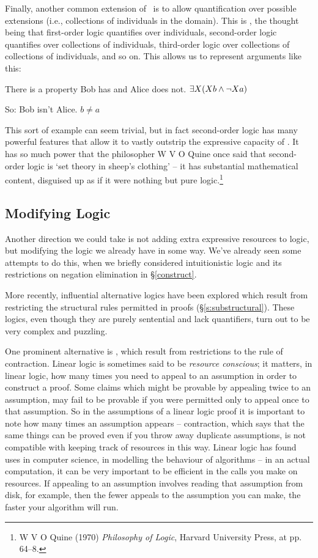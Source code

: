 Finally, another common extension of \FOL\ is to allow quantification over possible extensions (i.e., collections of individuals in the domain). This is , the thought being that first-order logic quantifies over individuals, second-order logic quantifies over collections of individuals, third-order logic over collections of collections of individuals, and so on. This allows us to represent arguments like this: \begin{earg}
	\item There is a property Bob has and Alice does not. $\exists X (Xb \wedge \neg Xa)$
	\item[So:] Bob isn't Alice. $b≠a$
\end{earg}
This sort of example can seem trivial, but in fact second-order logic has many powerful features that allow it to vastly outstrip the expressive capacity of \FOL. It has so much power that the philosopher W V O Quine once said that second-order logic is `set theory in sheep's clothing' – it has substantial mathematical content, disguised up as if it were nothing but pure logic.\footnote{W V O Quine (1970) \emph{Philosophy of Logic}, Harvard University Press, at pp. 64–8.}

\subsection{Modifying Logic}

Another direction we could take is not adding extra expressive resources to logic, but modifying the logic we already have in some way. We've already seen some attempts to do this, when we briefly considered intuitionistic logic and its restrictions on negation elimination in §\ref{construct}. 

More recently, influential alternative logics have been explored which result from restricting the structural rules permitted in proofs (§\ref{s:substructural}). These logics, even though they are purely sentential and lack quantifiers, turn out to be very complex and puzzling.

One prominent alternative is , which result from restrictions to the rule of contraction. Linear logic is sometimes said to be \emph{resource conscious}; it matters, in linear logic, how many times you need to appeal to an assumption in order to construct a proof. Some claims which might be provable by appealing twice to an assumption, may fail to be provable if you were permitted only to appeal once to that assumption. So in the assumptions of a linear logic proof it is important to note how many times an assumption appears – contraction, which says that the same things can be proved even if you throw away duplicate assumptions, is not compatible with keeping track of resources in this way. Linear logic has found uses in computer science, in modelling the behaviour of algorithms – in an actual computation, it can be very important to be efficient in the calls you make on resources. If appealing to an assumption involves reading that assumption from disk, for example, then the fewer appeals to the assumption you can make, the faster your algorithm will run.

